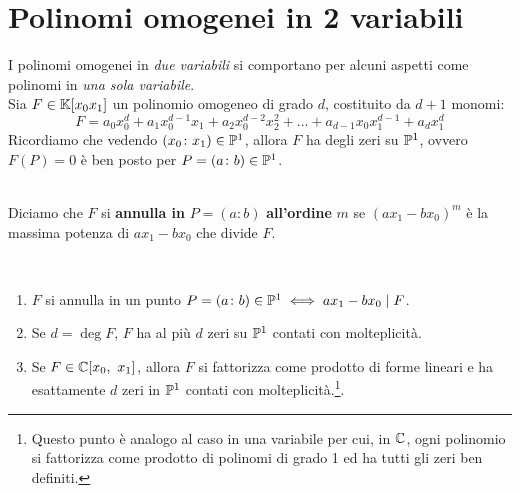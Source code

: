 \section{Polinomi omogenei in 2 variabili}
I polinomi omogenei in \textit{due variabili} si comportano per alcuni aspetti come polinomi in \textit{una sola variabile}.\\
Sia $F\in\mathbb{K}[x_0x_1]$ un polinomio omogeneo di grado $d$, costituito da $d+1$ monomi:
\begin{equation*}
	F=a_0x_0^d+a_1x_0^{d-1}x_1+a_2x_0^{d-2}x_2^2+\ldots + a_{d-1}x_0x_1^{d-1}+a_dx_1^d
\end{equation*}
Ricordiamo che vedendo $\left(x_0\colon x_1\right)\in\proj[1]{\ }$, allora $F$ ha degli zeri su $\proj[1]{\ }$, ovvero $F\left(P\right)=0$ è ben posto per $P=(a\colon b)\in\proj[1]{\ }$.
\begin{define}~{}\\
	Diciamo che $F$ si \textbf{annulla in } $P=(a\colon b)$ \textbf{all'ordine } $m$ se $(ax_1-bx_0)^m$ è la massima potenza di $ax_1-bx_0$ che divide $F$.
\end{define}
\begin{proposition}~{}\label{teo polinomi omogenei 2 variabili}
	\begin{enumerate}
		\item	$F$ si annulla in un punto $P=(a\colon b)\in\proj[1]{\ } \iff ax_1-bx_0\mid F$.
		\item 	Se $d=\deg F$, $F$ ha al più $d$ zeri su $\proj[1]{\ }$ contati con molteplicità. %
		\item	Se $F\in\mathbb{C}[x_0,\ x_1]$, allora $F$ si fattorizza come prodotto di forme lineari e ha esattamente $d$ zeri in $\proj[1]{\ }$ contati con molteplicità.\footnote{Questo punto è analogo al caso in una variabile per cui, in $\mathbb{C}$, ogni polinomio si fattorizza come prodotto di polinomi di grado 1 ed ha tutti gli zeri ben definiti.}.
	\end{enumerate}
\vspace{-3mm}
\end{proposition}
